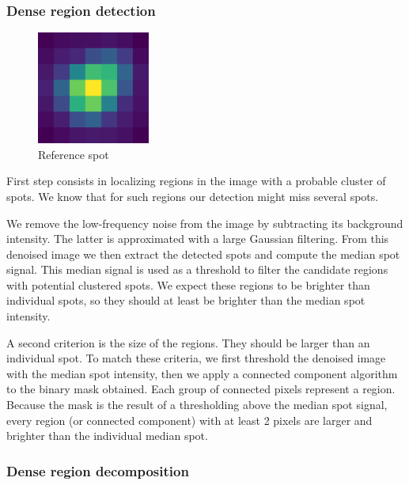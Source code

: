 \subsubsection{Dense region detection}

\begin{figure}
	\begin{center}
		\includegraphics[width=0.33\textwidth]{figures/chapter2/reference_spot}
	\caption{Reference spot}
	\label{fig:reference_spot}
	\end{center}
\end{figure}

First step consists in localizing regions in the image with a probable cluster of spots.
We know that for such regions our detection might miss several spots.

We remove the low-frequency noise from the image by subtracting its background intensity.
The latter is approximated with a large Gaussian filtering.
From this denoised image we then extract the detected spots and compute the median spot signal.
This median signal is used as a threshold to filter the candidate regions with potential clustered spots.
We expect these regions to be brighter than individual spots, so they should at least be brighter than the median spot intensity.

A second criterion is the size of the regions.
They should be larger than an individual spot.
To match these criteria, we first threshold the denoised image with the median spot intensity, then we apply a connected component algorithm~\cite{wu_connected_component_2005} to the binary mask obtained.
Each group of connected pixels represent a region.
Because the mask is the result of a thresholding above the median spot signal, every region (or connected component) with at least 2 pixels are larger and brighter than the individual median spot.

\subsubsection{Dense region decomposition}

